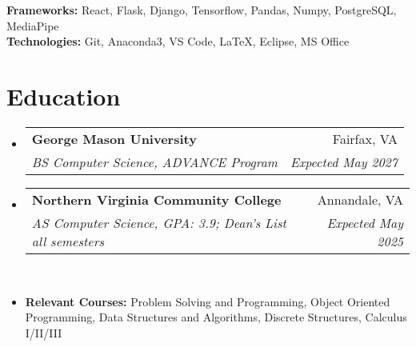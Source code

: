 \documentclass[letterpaper,11pt]{article}
\makeatletter
\newcommand{\resumeItem}[1]{
  \item\small{
    {#1 \vspace{-3pt}}
  }
}
\newcommand{\resumeSubheading}[4]{
  \vspace{-2pt}\item
    \begin{tabular*}{0.97\textwidth}[t]{l@{\extracolsep{\fill}}r@{\hspace{-0.2in}}}
        \textbf{#1} & #2 \\
        \textit{\small#3} & \textit{\small #4} \\
    \end{tabular*}\vspace{-7pt}
}
\newcommand{\resumeSubHeadingListStart}{\begin{itemize}[leftmargin=0.00in, rightmargin=-0.2in, label={}]}
\newcommand{\resumeSubHeadingListEnd}{\end{itemize}}
\newcommand{\resumeItemListStart}{\begin{itemize}[leftmargin=0.15in, rightmargin=0.15in]}
\newcommand{\resumeItemListEnd}{\end{itemize}\vspace{-7pt}}
\makeatother
\begin{document}
            \textbf{Frameworks: } React, Flask, Django, Tensorflow, Pandas, Numpy, PostgreSQL, MediaPipe\\
            \textbf{Technologies: } Git, Anaconda3, VS Code, LaTeX, Eclipse, MS Office\\

\section{Education}
    \resumeSubHeadingListStart
        \resumeSubheading
            {George Mason University}{Fairfax, VA}
            {BS Computer Science, ADVANCE Program}{Expected May 2027}

        \resumeSubheading
            {Northern Virginia Community College}{Annandale, VA}
            {AS Computer Science, GPA: 3.9; Dean's List all semesters}{Expected May 2025} \\
        
        \resumeItem{\textbf{Relevant Courses: }{Problem Solving and Programming, Object Oriented Programming, Data Structures and Algorithms, Discrete Structures, Calculus I/II/III}}
    \resumeSubHeadingListEnd


\end{document}
